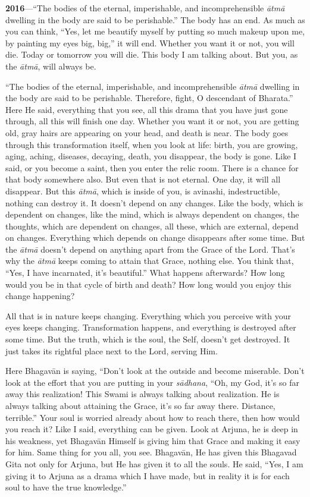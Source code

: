 \textbf{2016}---“The bodies of the eternal, imperishable, and incomprehensible \textit{ātmā} dwelling in the body are said to be perishable.” The body has an end. As much as you can think, “Yes, let me beautify myself by putting so much makeup upon me, by painting my eyes big, big,” it will end. Whether you want it or not, you will die. Today or tomorrow you will die. This body I am talking about. But you, as the \textit{ātmā}, will always be.

“The bodies of the eternal, imperishable, and incomprehensible \textit{ātmā} dwelling in the body are said to be perishable. Therefore, fight, O descendant of Bharata.” Here He said, everything that you see, all this drama that you have just gone through, all this will finish one day. Whether you want it or not, you are getting old, gray hairs are appearing on your head, and death is near. The body goes through this transformation itself, when you look at life: birth, you are growing, aging, aching, diseases, decaying, death, you disappear, the body is gone. Like I said, or you become a saint, then you enter the relic room. There is a chance for that body somewhere also. But even that is not eternal. One day, it will all disappear. But this \textit{ātmā}, which is inside of you, is avinashi, indestructible, nothing can destroy it. It doesn’t depend on any changes. Like the body, which is dependent on changes, like the mind, which is always dependent on changes, the thoughts, which are dependent on changes, all these, which are external, depend on changes. Everything which depends on change disappears after some time. But the \textit{ātmā} doesn’t depend on anything apart from the Grace of the Lord. That’s why the \textit{ātmā} keeps coming to attain that Grace, nothing else. You think that, “Yes, I have incarnated, it’s beautiful.” What happens afterwards? How long would you be in that cycle of birth and death? How long would you enjoy this change happening?

All that is in nature keeps changing. Everything which you perceive with your eyes keeps changing. Transformation happens, and everything is destroyed after some time. But the truth, which is the soul, the Self, doesn’t get destroyed. It just takes its rightful place next to the Lord, serving Him.

Here Bhagavān is saying, “Don’t look at the outside and become miserable. Don’t look at the effort that you are putting in your \textit{sādhana}, “Oh, my God, it’s so far away this realization! This Swami is always talking about realization. He is always talking about attaining the Grace, it’s so far away there. Distance, terrible.” Your soul is worried already about how to reach there, then how would you reach it? Like I said, everything can be given. Look at Arjuna, he is deep in his weakness, yet Bhagavān Himself is giving him that Grace and making it easy for him. Same thing for you all, you see. Bhagavān, He has given this Bhagavad Gita not only for Arjuna, but He has given it to all the souls. He said, “Yes, I am giving it to Arjuna as a drama which I have made, but in reality it is for each soul to have the true knowledge.”

